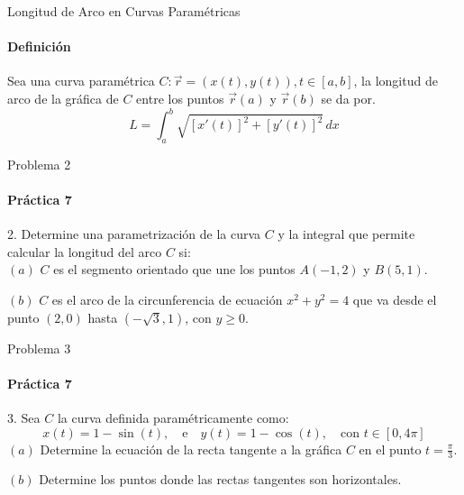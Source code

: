 \documentclass{plantillaPPT}
\begin{document}
\begin{frame}{Longitud de Arco en Curvas Paramétricas}
\framesubtitle{Definición}
    \begin{definicion}
        Sea una curva paramétrica $C: \vec{r}=(x(t),y(t)), t\in[a,b]$, la longitud de arco de la gráfica de $C$ entre los puntos $\vec{r}(a)$ y $\vec{r}(b)$ se da por.
        \begin{equation*}
            L = \int_a^b \sqrt{[x'(t)]^2+[y'(t)]^2}\,dx
        \end{equation*}
    \end{definicion}
\end{frame}

\begin{frame}{Problema 2}
\framesubtitle{Práctica 7}

2. Determine una parametrización de la curva $C$ y la integral que permite calcular la longitud del arco $C$ si:\\[5ex]
$(a)$ $C$ es el segmento orientado que une los puntos $A(-1,2)$ y $B(5,1)$.

$(b)$ $C$ es el arco de la circunferencia de ecuación $x^2+y^2=4$ que va desde el punto $(2, 0)$ hasta $(-\sqrt{3}, 1)$, con $y\geq0$.
    
\end{frame}

\begin{frame}{Problema 3}
\framesubtitle{Práctica 7}


3. Sea $C$ la curva definida paramétricamente como:
\begin{equation*}
    x(t) = 1-\sin(t), \quad \text{e} \quad y(t)=1-\cos(t), \quad \text{con } t\in[0,4\pi] 
\end{equation*}
$(a)$ Determine la ecuación de la recta tangente a la gráfica $C$ en el punto $t = \frac{\pi}{3}$.

$(b)$ Determine los puntos donde las rectas tangentes son horizontales.
    
\end{frame}
\end{document}
